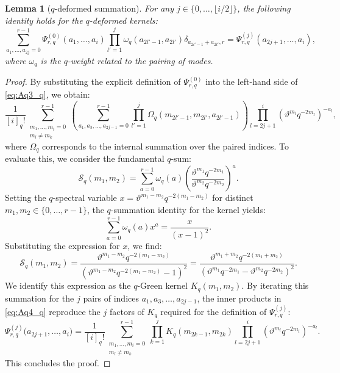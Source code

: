 \documentclass[reqno,11pt]{amsart}
\theoremstyle{plain}
\newtheorem{lemma}[theorem]{Lemma}
\theoremstyle{definition}
\theoremstyle{remark}
\numberwithin{equation}{section}
\renewcommand{\theta}{\vartheta}
\newcommand{\1}{\mathds{1}}
\newcommand{\2}{\frac{1}{2}}
\begin{document}
{				\begin{lemma}[$q$-deformed summation]\label{l:Aq1}
					{For any $j \in \{0, \dots, \lfloor i/2 \rfloor\}$, the following identity holds for the $q$-deformed kernels:
						\begin{equation}\label{eq:Aq3_q}
							\sum_{a_1, \dots, a_{2j} = 0}^{r-1} \Psi^{(0)}_{r,q}(a_1, \dots, a_i) \prod_{l'=1}^j \omega_q(a_{2l'-1}, a_{2l'}) \delta_{a_{2l'-1}+a_{2l'}, r} = \Psi^{(j)}_{r,q}(a_{2j+1}, \dots, a_i),
						\end{equation}
						where $\omega_q$ is the $q$-weight related to  the pairing of modes.}
				\end{lemma}
				\begin{proof}
					{By substituting the explicit definition of $\Psi^{(0)}_{r,q}$ into the left-hand side of \eqref{eq:Aq3_q}, we obtain:
						\begin{equation}\label{eq:Aq4_q}
							\frac{1}{[i]_q!} \sum_{\substack{m_1, \dots, m_i = 0 \\ m_l \neq m_k}}^{r-1} \left( \sum_{a_1, a_3, \dots, a_{2j-1} = 0}^{r-1} \prod_{l'=1}^j \Omega_q(m_{2l'-1}, m_{2l'}, a_{2l'-1}) \right) \prod_{l=2j+1}^i (\theta^{m_l}q^{-2m_l})^{-a_l},
						\end{equation}
						where $\Omega_q$ corresponds to the internal summation over the paired indices. To evaluate this, we consider the fundamental $q$-sum:
						\begin{equation}
							\mathcal{S}_q(m_1, m_2) = \sum_{a=0}^{r-1} \omega_q(a) \left( \frac{\theta^{m_1}q^{-2m_1}}{\theta^{m_2}q^{-2m_2}} \right)^a.
						\end{equation}
						Setting the $q$-spectral variable $x = \theta^{m_1-m_2} q^{-2(m_1-m_2)}$ for distinct $m_1, m_2 \in \{0, \dots, r-1\}$, the $q$-summation identity for the  kernel yields:
						\begin{equation}
							\sum_{a=0}^{r-1} \omega_q(a) x^a = \frac{x}{(x-1)^2}.
						\end{equation}
						Substituting the expression for $x$, we find:
						\begin{equation}
							\mathcal{S}_q(m_1, m_2) = \frac{\theta^{m_1-m_2} q^{-2(m_1-m_2)}}{\left(\theta^{m_1-m_2} q^{-2(m_1-m_2)} - 1\right)^2} = \frac{\theta^{m_1+m_2} q^{-2(m_1+m_2)}}{\left(\theta^{m_1}q^{-2m_1} - \theta^{m_2}q^{-2m_2}\right)^2}.
						\end{equation}
						We identify this expression as the  $q$-Green kernel ${K}_q(m_1, m_2)$. By iterating this summation for the $j$ pairs of indices $a_1, a_3, \dots, a_{2j-1}$, the inner products in \eqref{eq:Aq4_q} reproduce the $j$ factors of ${K}_q$ required for the definition of $\Psi^{(j)}_{r,q}$:
						\begin{equation}
							\Psi^{(j)}_{r,q} \big(a_{2j+1}, \dots, a_i\big) = \frac{1}{[i]_q!} \sum_{\substack{m_1, \dotsc, m_i = 0\\ m_l \neq m_k}}^{r-1} \prod_{k = 1}^j {K}_q(m_{2k-1}, m_{2k}) \prod_{l=2j+1}^i (\theta^{m_l} q^{-2m_l})^{-a_l}.
						\end{equation}
						This concludes the proof.}
				\end{proof}
				
}
\end{document}
